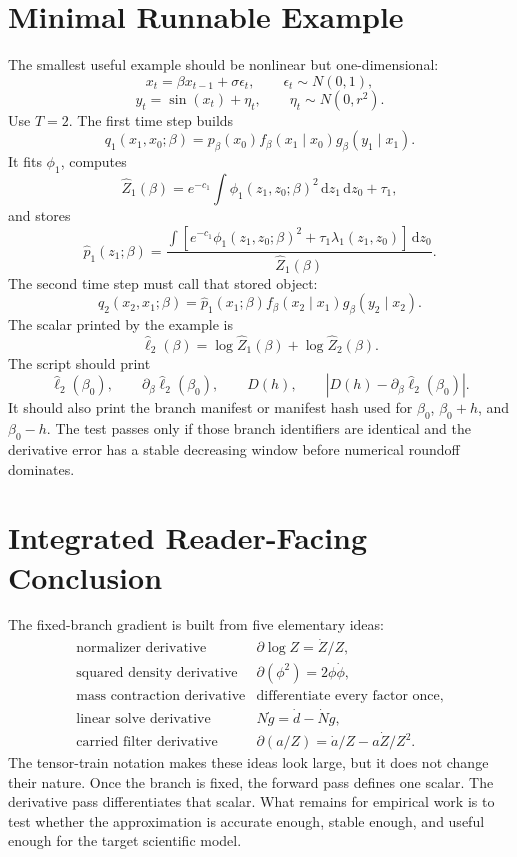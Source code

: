 \documentclass[11pt]{article}
\newcommand{\dd}{\,\mathrm d}
\newcommand{\widehatell}{\widehat\ell}
\begin{document}
\section{Minimal Runnable Example}

The smallest useful example should be nonlinear but one-dimensional:
\[
    x_t=\beta x_{t-1}+\sigma\epsilon_t,
    \qquad
    \epsilon_t\sim N(0,1),
    \tag{P19-102}
\]
\[
    y_t=\sin(x_t)+\eta_t,
    \qquad
    \eta_t\sim N(0,r^2).
    \tag{P19-103}
\]
Use \(T=2\).  The first time step builds
\[
    q_1(x_1,x_0;\beta)
    =
    p_\beta(x_0)
    f_\beta(x_1\mid x_0)
    g_\beta(y_1\mid x_1).
    \tag{P19-104}
\]
It fits \(\phi_1\), computes
\[
    \widehat Z_1(\beta)=e^{-c_1}\int \phi_1(z_1,z_0;\beta)^2
    \dd z_1\dd z_0+\tau_1,
    \tag{P19-105}
\]
and stores
\[
    \widehat p_1(z_1;\beta)
    =
    \frac{\int
    \left[e^{-c_1}\phi_1(z_1,z_0;\beta)^2+\tau_1\lambda_1(z_1,z_0)\right]
    \dd z_0}
    {\widehat Z_1(\beta)}.
    \tag{P19-106}
\]
The second time step must call that stored object:
\[
    q_2(x_2,x_1;\beta)
    =
    \widehat p_1(x_1;\beta)
    f_\beta(x_2\mid x_1)
    g_\beta(y_2\mid x_2).
    \tag{P19-107}
\]
The scalar printed by the example is
\[
    \widehatell_2(\beta)
    =
    \log\widehat Z_1(\beta)
    +
    \log\widehat Z_2(\beta).
    \tag{P19-108}
\]
The script should print
\[
    \widehatell_2(\beta_0),
    \qquad
    \partial_\beta\widehatell_2(\beta_0),
    \qquad
    D(h),
    \qquad
    |D(h)-\partial_\beta\widehatell_2(\beta_0)|.
    \tag{P19-109}
\]
It should also print the branch manifest or manifest hash used for
\(\beta_0\), \(\beta_0+h\), and \(\beta_0-h\).  The test passes only if those
branch identifiers are identical and the derivative error has a stable
decreasing window before numerical roundoff dominates.

\section{Integrated Reader-Facing Conclusion}

The fixed-branch gradient is built from five elementary ideas:
\[
\begin{array}{ll}
\text{normalizer derivative} & \partial\log Z=\dot Z/Z,\\[2mm]
\text{squared density derivative} & \partial(\phi^2)=2\phi\dot\phi,\\[2mm]
\text{mass contraction derivative} & \text{differentiate every factor once},\\[2mm]
\text{linear solve derivative} & N\dot g=\dot d-\dot N g,\\[2mm]
\text{carried filter derivative} & \partial(a/Z)=\dot a/Z-a\dot Z/Z^2.
\end{array}
\tag{P19-110}
\]
The tensor-train notation makes these ideas look large, but it does not change
their nature.  Once the branch is fixed, the forward pass defines one scalar.
The derivative pass differentiates that scalar.  What remains for empirical
work is to test whether the approximation is accurate enough, stable enough,
and useful enough for the target scientific model.
\end{document}
